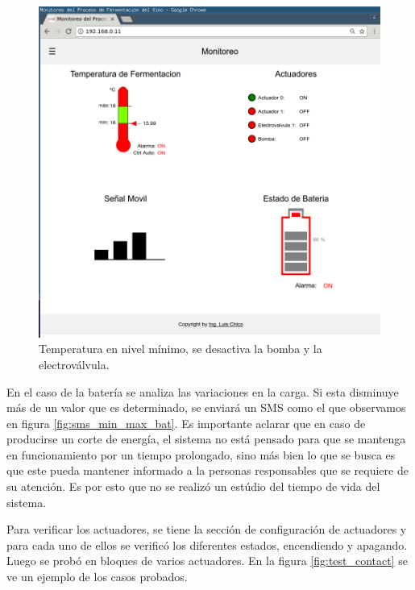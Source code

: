 \begin{figure}[h]
  \centering
  \includegraphics[scale=.3]{./Figures/auto_control_inactive.png}
  \caption{Temperatura en nivel mínimo, se desactiva la bomba y la electroválvula.}
  \label{fig:auto_control_inactive}
\end{figure}


En el caso de la batería se analiza las variaciones en la carga. Si esta disminuye más de un valor que es determinado, se enviará un SMS como el que observamos en figura \ref{fig:sms_min_max_bat}. Es importante aclarar que en caso de producirse un corte de energía, el sistema no está pensado para que se mantenga en funcionamiento por un tiempo prolongado, sino más bien lo que se busca es que este pueda mantener informado a la personas responsables que se requiere de su atención. Es por esto que no se realizó un estúdio del tiempo de vida del sistema.

Para verificar los actuadores, se tiene la sección de configuración de actuadores y para cada uno de ellos se verificó los diferentes estados, encendiendo y apagando. Luego se probó en bloques de varios actuadores. En la figura \ref{fig:test_contact} se ve un ejemplo de los casos probados.

